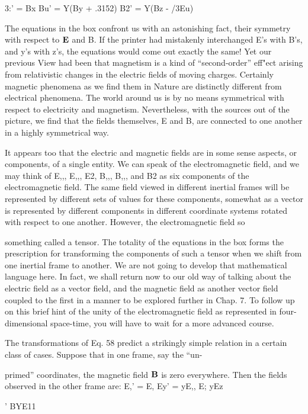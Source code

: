  

3:' = Bx Bu' = Y(By + .3152) B2' = Y(Bz - /3Eu)

The equations in the box confront us with an astonishing fact, their
symmetry with respect to $\mathbf{E}$ and B. If the printer had mistakenly
interchanged E's with B's, and y's with z's, the equations would come
out exactly the same! Yet our previous View had been that magnetism
is a kind of ``second-order'' eff"ect arising from relativistic
changes in the electric fields of moving charges. Certainly magnetic
phenomena as we find them in Nature are distinctly different from
electrical phenomena. The world around us is by no means symmetrical
with respect to electricity and magnetism. Nevertheless,
with the sources out of the picture, we find that the fields themselves,
E and B, are connected to one another in a highly symmetrical way.

It appears too that the electric and magnetic fields are in some
sense aspects, or components, of a single entity. We can speak of the
electromagnetic field, and we may think of E,,, E,,, E2, B,,, B,,, and B2 as
six components of the electromagnetic field. The same field viewed
in different inertial frames will be represented by different sets of
values for these components, somewhat as a vector is represented by
different components in different coordinate systems rotated with
respect to one another. However, the electromagnetic field so

something called a tensor. The totality of the equations in the box
forms the prescription for transforming the components of such a
tensor when we shift from one inertial frame to another. We are not
going to develop that mathematical language here. In fact, we shall
return now to our old way of talking about the electric field as a vector
field, and the magnetic field as another vector field coupled to the
first in a manner to be explored further in Chap. 7. To follow up on
this brief hint of the unity of the electromagnetic field as represented
in four-dimensional space-time, you will have to wait for a more
advanced course.

The transformations of Eq. 58 predict a strikingly simple relation
in a certain class of cases. Suppose that in one frame, say the ``un-

primed'' coordinates, the magnetic field $\mathbf{B}$ is zero everywhere. Then
the fields observed in the other frame are:
E,' = E, Ey' = yE,, E; yEz

\begin{equation}
\end{equation}
' BYE11

